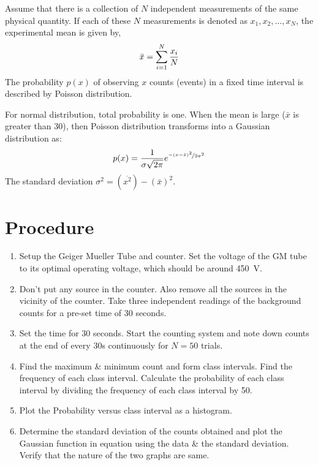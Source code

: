 	Assume that there is a collection of $ N $ independent measurements of the same physical quantity. If each of these $ N $ measurements is denoted
	as $x_{1}, x_{2}, \ldots , x_{N}$, the experimental mean is given by,
	\begin{equation}{\label{eqn:mean}}
		\bar{x}=\sum\limits_{i=1}^{N}\dfrac{x_i}{N}
	\end{equation}
	The probability $p(x)$ of observing $x$ counts (events) in a fixed time interval is described by Poisson distribution.
	
	
	For normal distribution, total probability is one. When the mean is large ($\bar{x}$ is greater than 30), then Poisson distribution transforms into a Gaussian distribution as:
	\begin{equation}{\label{eqn:stdev}}
		p(x)=\dfrac{1}{\sigma\sqrt{2 \pi}} e^{\nicefrac{-(x-\bar{x})^2}{2 \sigma^2}}
	\end{equation}
	The standard deviation $\sigma^2 = (\overline{x^2}) - (\bar{x})^2$.
	
	\section{Procedure}
	\begin{enumerate}
		\item 	 Setup the Geiger Mueller Tube and counter. Set the voltage of the GM tube to its optimal operating voltage, which should be around \SI{450}{\volt}.
		\item 	  Don't put any source in the counter. Also remove all the sources in the vicinity of the counter. Take three independent readings of the background counts for a pre-set time of 30 seconds.
		\item  Set the time for 30 seconds. Start the counting system and note down counts at the end of every 30s continuously for $N=50$ trials.
		
		\item Find the maximum \& minimum count and form class intervals. Find the frequency of each class interval. Calculate the probability of each class interval by dividing the frequency of each class interval by 50.
		
		\item 	Plot the Probability versus class interval as a histogram.
		
		\item 	Determine the standard deviation of the counts obtained and plot the Gaussian function in equation using the data \& the standard deviation. Verify that the nature of the two graphs are same.
		
	\end{enumerate}
	\clearpage
